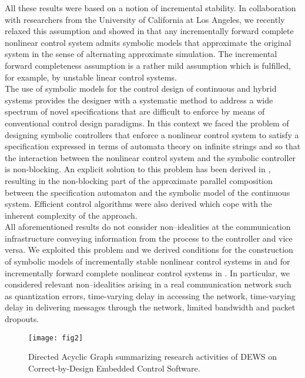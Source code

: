 \documentclass[submission,copyright,creativecommons]{eptcs}
\begin{document}
All these results were based on a notion of incremental stability. In collaboration with researchers from the University of California at Los Angeles, we recently relaxed this assumption and showed in \cite{MajidTAC11} that any incrementally forward complete nonlinear control system admits symbolic models that approximate the original system in the sense of alternating approximate simulation. The incremental forward completeness assumption is a rather mild assumption which is fulfilled, for example, by unstable linear control systems. \\
The use of symbolic models for the control design of continuous and hybrid systems provides the designer with a systematic method to address a wide spectrum of novel specifications that are difficult to enforce by means of conventional control design paradigms. In this context we faced the problem of designing symbolic controllers that enforce a nonlinear control system to satisfy a specification expressed in terms of automata theory on infinite strings and so that the interaction between the nonlinear control system and the symbolic controller is non-blocking. An explicit solution to this problem has been derived in \cite{PolaTAC12}, resulting in the non-blocking part of the approximate parallel composition between the specification automaton and the symbolic model of the continuous system. Efficient control algorithms were also derived which cope with the inherent complexity of the approach.\\
All aforementioned results do not consider non--idealities at the communication infrastructure conveying information from the process to the controller and vice versa. We exploited this problem and we derived conditions for the construction of symbolic models of incrementally stable nonlinear control systems in \cite{BorriHSCC12} and for incrementally forward complete nonlinear control systems in \cite{BorriCDC2012}. In particular, we considered  relevant non--idealities arising in a real communication network such as quantization errors, time-varying delay in accessing the network, time-varying delay in delivering messages through the network, limited bandwidth and packet dropouts.

\begin{figure}
\begin{center}
\texttt{[image: fig2]}
\caption{Directed Acyclic Graph summarizing research activities of DEWS on Correct-by-Design Embedded Control Software.}
\label{fig2}
\end{center}
\end{figure}



\end{document}
